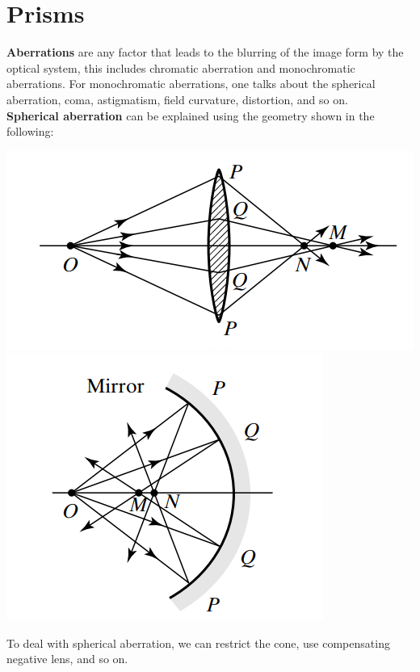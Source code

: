 \documentclass[11pt]{book}
\theoremstyle{break}
\theoremstyle{break}
\begin{document}
\newpage
\section[Prisms]{\color{red}Prisms \color{black}}
\textbf{Aberrations} are any factor that leads to the blurring of the image form by the optical system, this includes chromatic aberration and monochromatic aberrations. For monochromatic aberrations, one talks about the spherical aberration, coma, astigmatism, field curvature, distortion, and so on. \\

\textbf{Spherical aberration} can be explained using the geometry shown in the following:
\begin{center}
\includegraphics[scale=0.45]{sphAberr.png} \qquad \includegraphics[scale=0.45]{sphAberr1.png}
\end{center}
To deal with spherical aberration, we can restrict the cone, use compensating negative lens, and so on.\\
\end{document}
